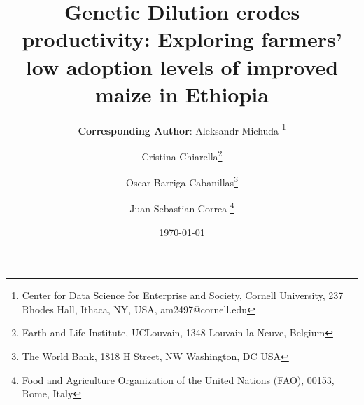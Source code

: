 \documentclass[11pt]{article}
\begin{document}
    \begin{titlepage}
    
    \title{Genetic Dilution erodes productivity: Exploring farmers' low adoption levels of improved maize in  Ethiopia}


\author{%
 \textbf{Corresponding Author}: Aleksandr Michuda \footnote{Center for Data Science for Enterprise and Society, Cornell University, 237 Rhodes Hall, Ithaca, NY, USA, am2497@cornell.edu}%
 \and Cristina Chiarella\footnote{Earth and Life Institute, UCLouvain, 1348 Louvain-la-Neuve, Belgium}%
 \and Oscar Barriga-Cabanillas\footnote{The World Bank, 1818 H Street, NW Washington, DC USA}%
  \and Juan Sebastian Correa \footnote{Food and Agriculture Organization of the United Nations (FAO), 00153, Rome, Italy}%
  }

	\date{\today}


\end{titlepage}
\end{document}
